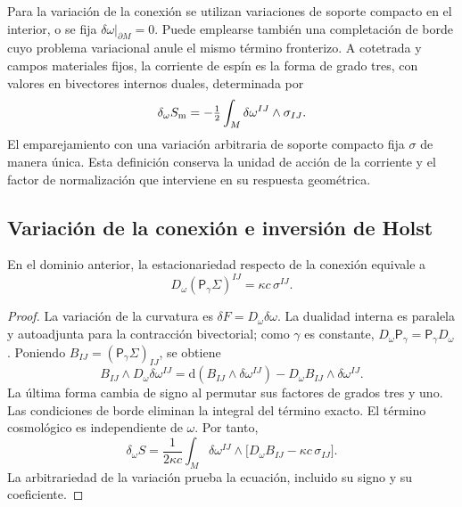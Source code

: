 Para la variación de la conexión se utilizan variaciones de soporte
compacto en el interior, o se fija
\(\delta\omega|_{\partial M}=0\). Puede emplearse también una
completación de borde cuyo problema variacional anule el mismo término
fronterizo. A cotetrada y campos materiales fijos, la corriente de espín
es la forma de grado tres, con valores en bivectores internos duales,
determinada por
\begin{equation}
 \delta_\omega S_{\rm m}
 =-\tfrac12\int_M\delta\omega^{IJ}\wedge\sigma_{IJ}.
 \label{vii:eq:corriente-variacional}
\end{equation}
El emparejamiento con una variación arbitraria de soporte compacto fija
\(\sigma\) de manera única. Esta definición conserva la unidad de
acción de la corriente y el factor de normalización que interviene en
su respuesta geométrica.

\subsection{Variación de la conexión e inversión de Holst}
\label{vii:subsec:variacion-holst}

\begin{theorem}
\label{vii:thm:ecuacion-cartan-holst}
En el dominio anterior, la estacionariedad respecto de la conexión
equivale a
\begin{equation}
 D_\omega(\mathsf P_\gamma\Sigma)^{IJ}
       =\kappa c\,\sigma^{IJ}.
 \label{vii:eq:ecuacion-cartan-holst}
\end{equation}
\end{theorem}
\begin{proof}
La variación de la curvatura es
\(\delta F=D_\omega\delta\omega\). La dualidad interna es paralela
y autoadjunta para la contracción bivectorial; como \(\gamma\) es
constante, \(D_\omega\mathsf P_\gamma=\mathsf P_\gamma D_\omega\).
Poniendo \(B_{IJ}=(\mathsf P_\gamma\Sigma)_{IJ}\), se obtiene
\[
 B_{IJ}\wedge D_\omega\delta\omega^{IJ}
 =\mathrm d(B_{IJ}\wedge\delta\omega^{IJ})
   -D_\omega B_{IJ}\wedge\delta\omega^{IJ}.
\]
La última forma cambia de signo al permutar sus factores de grados tres
y uno. Las condiciones de borde eliminan la integral del término
exacto. El término cosmológico es independiente de \(\omega\).
Por tanto,
\[
 \delta_\omega S=
 \frac1{2\kappa c}\int_M\delta\omega^{IJ}\wedge
       \bigl[D_\omega B_{IJ}-\kappa c\,\sigma_{IJ}\bigr].
\]
La arbitrariedad de la variación prueba la ecuación, incluido su signo
y su coeficiente.
\end{proof}

